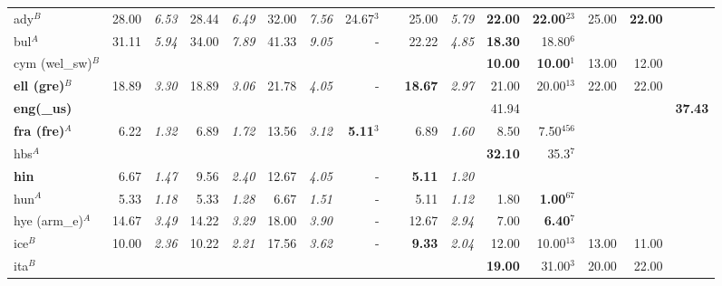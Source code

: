 \begin{landscape}
{\begin{tabularx}{1.65\textwidth}{Xrrrrrrrrrr|rrrrr}
ady$^B$         & 28.00        &\textit{6.53} & 28.44 &\textit{6.49} & 32.00 &\textit{7.56} & 24.67$^3$       & & 25.00        &\textit{5.79} &\textbf{22.00} & \textbf{22.00$^{23}$} & 25.00 & \textbf{22.00}& \\
bul$^A$ 	    & 31.11        &\textit{5.94} & 34.00 &\textit{7.89} & 41.33 &\textit{9.05} &    -            & & 22.22        &\textit{4.85} &\textbf{18.30} & 18.80$^6$    &       &       & \\
cym (wel\_sw)$^B$   &              &              &       &              &       &              &                 & &              &              &\textbf{10.00} & \textbf{10.00$^1$}    & 13.00 & 12.00 & \\
\textbf{ell (gre)$^B$}& 18.89  &\textit{3.30} & 18.89 &\textit{3.06} & 21.78 &\textit{4.05} & -               & &\textbf{18.67}&\textit{2.97} & 21.00 & 20.00$^{13}$ & 22.00 & 22.00 & \\
\textbf{eng(\_us)}&            &              &       &              &       &              &                 & &              &              & 41.94 &              &       &       & \textbf{37.43}\\
\textbf{fra (fre)$^A$}& 6.22   &\textit{1.32} & 6.89  &\textit{1.72} & 13.56 &\textit{3.12} &\textbf{5.11$^3$} && 6.89         &\textit{1.60} & 8.50  & 7.50$^{456}$ &       &       & \\
hbs$^A$         &              &              &       &              &       &              &                 & &              &              &\textbf{32.10} & 35.3$^7$    & & & \\
\textbf{hin} 	& 6.67         &\textit{1.47} & 9.56  &\textit{2.40} & 12.67 &\textit{4.05} & -               & &\textbf{5.11} &\textit{1.20} &       &              &       &       & \\
hun$^A$ 	    & 5.33         &\textit{1.18} & 5.33  &\textit{1.28} & 6.67  &\textit{1.51} &        -        & &  5.11        &\textit{1.12} & 1.80  &  \textbf{1.00$^{67}$} &       &       & \\
hye (arm\_e)$^A$   & 14.67        &\textit{3.49} & 14.22 &\textit{3.29} & 18.00 &\textit{3.90} & -               & & 12.67        &\textit{2.94} & 7.00  &  \textbf{6.40$^{7}$}  &       &       & \\
ice$^B$ 	    & 10.00        &\textit{2.36} & 10.22 &\textit{2.21} & 17.56 &\textit{3.62} &    -            & &\textbf{9.33} &\textit{2.04} & 12.00 & 10.00$^{13}$ & 13.00 & 11.00 & \\
ita$^B$         &              &              &       &              &       &              &                 & &              &              &\textbf{19.00} & 31.00$^{3}$  & 20.00 & 22.00 & \\

\end{tabularx}}
\end{landscape}

